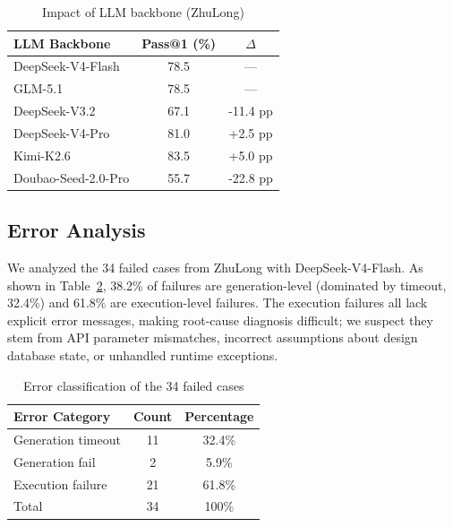\documentclass[anonymous, sigconf]{acmart}
\begin{document}
\begin{table}[htbp]
\centering
\caption{Impact of LLM backbone (ZhuLong)}
\label{tab:llm-comparison}
\begin{tabular}{lcc}
\toprule
\textbf{LLM Backbone} & \textbf{Pass@1 (\%)} & \textbf{$\Delta$} \\
\midrule
DeepSeek-V4-Flash & 78.5 & — \\
GLM-5.1 & 78.5 & — \\
DeepSeek-V3.2 & 67.1 & -11.4 pp \\
DeepSeek-V4-Pro & 81.0 & +2.5 pp \\
Kimi-K2.6 & 83.5 & +5.0 pp \\
Doubao-Seed-2.0-Pro & 55.7 & -22.8 pp \\
\bottomrule
\end{tabular}
\end{table}

\subsection{Error Analysis}
\label{sec:exp-error}

We analyzed the 34 failed cases from ZhuLong with DeepSeek-V4-Flash. As shown in Table~\ref{tab:error-classification}, 38.2\% of failures are generation-level (dominated by timeout, 32.4\%) and 61.8\% are execution-level failures. The execution failures all lack explicit error messages, making root-cause diagnosis difficult; we suspect they stem from API parameter mismatches, incorrect assumptions about design database state, or unhandled runtime exceptions.

\begin{table}[htbp]
\centering
\caption{Error classification of the 34 failed cases}
\label{tab:error-classification}
\begin{tabular}{lcc}
\toprule
\textbf{Error Category} & \textbf{Count} & \textbf{Percentage} \\
\midrule
Generation timeout & 11 & 32.4\% \\
Generation fail & 2 & 5.9\% \\
Execution failure & 21 & 61.8\% \\
\midrule
Total & 34 & 100\% \\
\bottomrule
\end{tabular}
\end{table}
\end{document}
